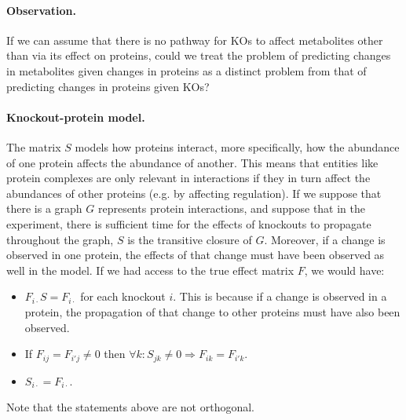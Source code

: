 \documentclass{article}
\begin{document}
\paragraph{Observation.} If we can assume that there is no pathway for KOs to affect metabolites other than via its effect on proteins, could we treat the problem of predicting changes in metabolites given changes in proteins as a distinct problem from that of predicting changes in proteins given KOs?

\paragraph{Knockout-protein model.}
The matrix $S$ models how proteins interact, more specifically, how the abundance of one protein affects the abundance of another.
This means that entities like protein complexes are only relevant in interactions if they in turn affect the abundances of other proteins (e.g. by affecting regulation).
If we suppose that there is a graph $G$ represents protein interactions, and suppose that in the experiment, there is sufficient time for the effects of knockouts to propagate throughout the graph, $S$ is the transitive closure of $G$.
Moreover, if a change is observed in one protein, the effects of that change must have been observed as well in the model.
If we had access to the true effect matrix $F$, we would have:
\begin{itemize}
 \item $F_{i \cdot} S = F_{i \cdot}$ for each knockout $i$. This is because if a change is observed in a protein, the propagation of that change to other proteins must have also been observed.
 \item If $F_{i j} = F_{i' j} \neq 0$ then $\forall k : S_{j k} \neq 0 \Rightarrow F_{i k} = F_{i' k}$.
 \item $S_{i \cdot} = F_{i \cdot}$.
\end{itemize}
Note that the statements above are not orthogonal.
\end{document}
